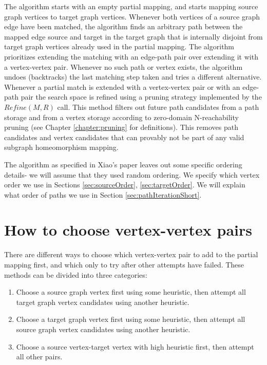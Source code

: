 The algorithm starts with an empty partial mapping, and starts mapping source graph vertices to target graph vertices. Whenever both vertices of a source graph edge have been matched, the algorithm finds an arbitrary path between the mapped edge source and target in the target graph that is internally disjoint from target graph vertices already used in the partial mapping. The algorithm prioritizes extending the matching with an edge-path pair over extending it with a vertex-vertex pair. Whenever no such path or vertex exists, the algorithm undoes (backtracks) the last matching step taken and tries a different alternative. Whenever a partial match is extended with a vertex-vertex pair or with an edge-path pair the search space is refined using a pruning strategy implemented by the $Refine(M,R)$ call. This method filters out future path candidates from a path storage and from a vertex storage according to zero-domain N-reachability pruning (see Chapter \ref{chapter:pruning} for definitions). This removes path candidates and vertex candidates that can provably not be part of any valid subgraph homeomorphism mapping.

The algorithm as specified in Xiao's paper leaves out some specific ordering details- we will assume that they used random ordering. We specify which vertex order we use in Sections \ref{sec:sourceOrder}, \ref{sec:targetOrder}. We will explain what order of paths we use in Section \ref{sec:pathIterationShort}.

\section{How to choose vertex-vertex pairs}
There are different ways to choose which vertex-vertex pair to add to the partial mapping first, and which only to try after other attempts have failed. These methods can be divided into three categories:

\begin{enumerate}
\item Choose a source graph vertex first using some heuristic, then attempt all target graph vertex candidates using another heuristic.
\item Choose a target graph vertex first using some heuristic, then attempt all source graph vertex candidates using another heuristic.
\item Choose a source vertex-target vertex with high heuristic first, then attempt all other pairs.
\end{enumerate}

